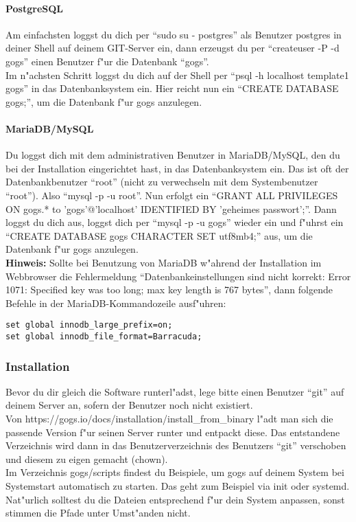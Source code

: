 \documentclass[german,a4paper]{report}
\begin{document}
\paragraph{PostgreSQL}
Am einfachsten loggst du dich per ``sudo su - postgres'' als Benutzer postgres in deiner
Shell auf deinem GIT-Server ein, dann erzeugst du per ``createuser -P -d gogs'' einen Benutzer
f"ur die Datenbank ``gogs''.\\
Im n"achsten Schritt loggst du dich auf der Shell per ``psql -h localhost template1 gogs''
in das Datenbanksystem ein. Hier reicht nun ein ``CREATE DATABASE gogs;'', um die Datenbank
f"ur gogs anzulegen.

\paragraph{MariaDB/MySQL}
Du loggst dich mit dem administrativen Benutzer in MariaDB/MySQL, den du bei der Installation
eingerichtet hast, in das Datenbanksystem ein. Das ist oft der Datenbankbenutzer ``root''
(nicht zu verwechseln mit dem Systembenutzer ``root''). Also ``mysql -p -u root''. Nun
erfolgt ein ``GRANT ALL PRIVILEGES ON gogs.* to 'gogs'@'localhost' IDENTIFIED BY
'geheimes passwort';''. Dann loggst du dich aus, loggst dich per ``mysql -p -u gogs''
wieder ein und f"uhrst ein ``CREATE DATABASE gogs CHARACTER SET utf8mb4;'' aus,
um die Datenbank f"ur gogs anzulegen.
\\
\textbf{Hinweis:} Sollte bei Benutzung von MariaDB w"ahrend der Installation im
Webbrowser die Fehlermeldung ``Datenbankeinstellungen sind nicht korrekt: Error 1071: Specified key was too long; max key length is 767 bytes'', dann folgende Befehle in der
MariaDB-Kommandozeile ausf"uhren:
\begin{verbatim}
set global innodb_large_prefix=on;
set global innodb_file_format=Barracuda;
\end{verbatim}

\subsubsection{Installation}
Bevor du dir gleich die Software runterl"adst, lege bitte einen Benutzer ``git'' auf deinem
Server an, sofern der Benutzer noch nicht existiert.\\
Von https://gogs.io/docs/installation/install\_from\_binary l"adt man sich die passende Version
f"ur seinen Server runter und entpackt diese. Das entstandene Verzeichnis wird dann in das
Benutzerverzeichnis des Benutzers ``git'' verschoben und diesem zu eigen gemacht (chown).\\
Im Verzeichnis gogs/scripts findest du Beispiele, um gogs auf deinem System bei Systemstart
automatisch zu starten. Das geht zum Beispiel via init oder systemd.\\
Nat"urlich solltest du die Dateien entsprechend f"ur dein System anpassen, sonst stimmen
die Pfade unter Umst"anden nicht.
\end{document}
